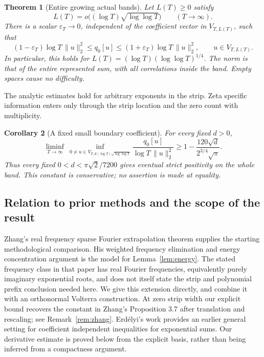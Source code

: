 \documentclass[11pt]{article}
\newtheorem{theorem}{Theorem}[section]
\newtheorem{corollary}[theorem]{Corollary}
\theoremstyle{remark}
\newcommand{\norm}[1]{\lVert #1\rVert}
\begin{document}
\begin{theorem}[Entire growing actual bands]\label{thm:main}
Let $L(T)\ge0$ satisfy
\begin{equation}\label{eq:width}
 L(T)=o\bigl((\log T)\sqrt{\log\log T}\bigr)
 \qquad (T\longrightarrow\infty).
\end{equation}
There is a scalar $\varepsilon_T\to0$, independent of the coefficient
vector in $V_{T,L(T)}$, such that
\begin{equation}\label{eq:main}
 (1-\varepsilon_T)\log T\,\norm u_2^2
 \le q_0[u]\le
 (1+\varepsilon_T)\log T\,\norm u_2^2,\qquad u\in V_{T,L(T)}.
\end{equation}
In particular, this holds for $L(T)=(\log T)(\log\log T)^{1/4}$.
The norm is that of the entire represented sum, with all correlations
inside the band. Empty spaces cause no difficulty.
\end{theorem}

The analytic estimates hold for arbitrary exponents in the strip.
Zeta specific information enters only through the strip location and
the zero count with multiplicity.
\begin{corollary}[A fixed small boundary coefficient]\label{cor:boundary}
For every fixed $d>0$,
\begin{equation}\label{eq:boundary}
 \liminf_{T\to\infty}\ \inf_{0\ne u\in
 V_{T,d(\log T)\sqrt{\log\log T}}}
 \frac{q_0[u]}{\log T\,\norm u_2^2}
 \ge 1-\frac{120\sqrt d}{2^{3/4}\sqrt\pi}.
\end{equation}
Thus every fixed $0<d<\pi\sqrt2/7200$ gives eventual strict positivity
on the whole band. This constant is conservative; no assertion is made
at equality.
\end{corollary}

\subsection{Relation to prior methods and the scope of the result}
Zhang's real frequency sparse Fourier extrapolation theorem
\cite[Theorem 1.1 and Proposition 3.7]{Zhang} supplies the starting
methodological comparison. His weighted frequency elimination and energy
concentration argument is the model for Lemma~\ref{lem:energy}.
The stated frequency class in that paper has real Fourier frequencies,
equivalently purely imaginary exponential roots, and does not itself
state the strip and polynomial prefix conclusion needed here.
We give this extension directly, and combine it with an orthonormal
Volterra construction. At zero strip width our explicit bound recovers
the constant in Zhang's Proposition 3.7 after translation and rescaling;
see Remark~\ref{rem:zhang}.
Erd\'elyi's work \cite{Erdelyi} provides an earlier general setting for
coefficient independent inequalities for exponential sums. Our derivative
estimate is proved below from the explicit basis, rather than being
inferred from a compactness argument.
\end{document}
